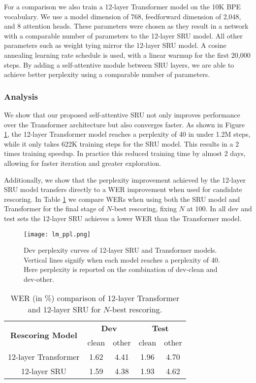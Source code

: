 \documentclass[a4paper]{article}
\begin{document}
For a comparison we also train a 12-layer Transformer model on the 10K BPE vocabulary. We use a model dimension of 768, feedforward dimension of 2,048, and 8 attention heads. These parameters were chosen as they result in a network with a comparable number of parameters to the 12-layer SRU model. All other parameters such as weight tying mirror the 12-layer SRU model. A cosine annealing learning rate schedule is used, with a linear warmup for the first 20,000 steps. By adding a self-attentive module between SRU layers, we are able to achieve better perplexity using a comparable number of parameters.


\subsubsection{Analysis}
We show that our proposed self-attentive SRU not only improves performance over the Transformer architecture but also converges faster. As shown in Figure \ref{fig:lm_ppl}, the 12-layer Transformer model reaches a perplexity of 40 in under 1.2M steps, while it only takes 622K training steps for the SRU model. This results in a 2 times training speedup. In practice this reduced training time by almost 2 days, allowing for faster iteration and greater exploration.

Additionally, we show that the perplexity improvement achieved by the 12-layer SRU model transfers directly to a WER improvement when used for candidate rescoring. In Table \ref{table:lm_wer} we compare WERs when using both the SRU model and Transformer for the final stage of $N$-best rescoring, fixing $N$ at 100. In all dev and test sets the 12-layer SRU achieves a lower WER than the Transformer model.


\begin{figure}[t]
\texttt{[image: lm\_ppl.png]}
  \caption{Dev perplexity curves of 12-layer SRU and Transformer models. Vertical lines signify when each model reaches a perplexity of 40. Here perplexity is reported on the combination of dev-clean and dev-other.}
  \label{fig:lm_ppl}
\end{figure}


\begin{table}[t]
\centering
\begin{tabular}{c|c|c|c|c}
\hline
\multirow{2}{*}{\textbf{Rescoring Model}} & \multicolumn{2}{c|}{\textbf{Dev}} & \multicolumn{2}{c}{\small \textbf{Test}}\\
\cline{2-5} 
& clean & other & clean & other \\
\hline
12-layer Transformer & 1.62 & 4.41 & 1.96 & 4.70 \\
\hline
12-layer SRU & 1.59 & 4.38 & 1.93 & 4.62 \\
\hline
\end{tabular}
\vspace{1em}
\caption{WER (in \%) comparison of 12-layer Transformer and 12-layer SRU for $N$-best rescoring.}
\label{table:lm_wer}
\vspace{-5mm}
\end{table}
\end{document}
